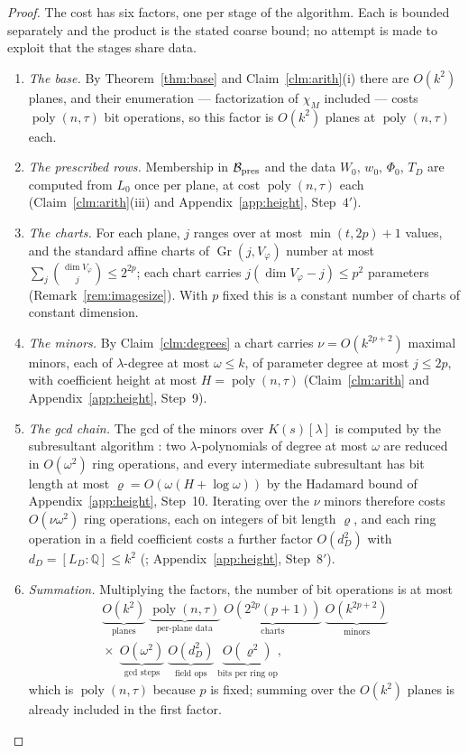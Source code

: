 \documentclass[journal]{IEEEtran}
\theoremstyle{plainn}
\theoremstyle{remark}
\newcommand{\Gr}{\operatorname{Gr}}
\newcommand{\poly}{\operatorname{poly}}
\begin{document}
\begin{proof}
The cost has six factors, one per stage of the algorithm. Each is bounded separately and the product is the
stated coarse bound; no attempt is made to exploit that the stages share data.
\begin{enumerate}[label=(\alph*),leftmargin=*,itemsep=1pt,topsep=2pt]
\item \emph{The base.} By Theorem~\ref{thm:base} and Claim~\ref{clm:arith}(i) there are $O(k^2)$ planes,
and their enumeration --- factorization of $\chi_M$ included --- costs $\poly(n,\tau)$ bit operations, so
this factor is $O(k^2)$ planes at $\poly(n,\tau)$ each.
\item \emph{The prescribed rows.} Membership in $\mathcal B_{\rm pres}$ and the data $W_0$, $w_0$,
$\Phi_0$, $T_D$ are computed from $L_0$ once per plane, at cost $\poly(n,\tau)$ each
(Claim~\ref{clm:arith}(iii) and Appendix~\ref{app:height}, Step~$4'$).
\item \emph{The charts.} For each plane, $j$ ranges over at most $\min(t,2p)+1$ values, and the standard
affine charts of $\Gr(j,V_\varphi)$ number at most $\sum_j\binom{\dim V_\varphi}{j}\le2^{2p}$; each chart
carries $j(\dim V_\varphi-j)\le p^2$ parameters (Remark~\ref{rem:imagesize}). With $p$ fixed this is a
constant number of charts of constant dimension.
\item \emph{The minors.} By Claim~\ref{clm:degrees} a chart carries $\nu=O(k^{2p+2})$ maximal minors, each
of $\lambda$-degree at most $\omega\le k$, of parameter degree at most $j\le2p$, with coefficient height at
most $H=\poly(n,\tau)$ (Claim~\ref{clm:arith} and Appendix~\ref{app:height}, Step~9).
\item \emph{The gcd chain.} The gcd of the minors over $K(s)[\lambda]$ is computed by the subresultant
algorithm \cite{vzgg13}: two $\lambda$-polynomials of degree at most $\omega$ are reduced in $O(\omega^2)$
ring operations, and every intermediate subresultant has bit length at most
$\varrho=O(\omega(H+\log\omega))$ by the Hadamard bound of Appendix~\ref{app:height}, Step~10. Iterating
over the $\nu$ minors therefore costs $O(\nu\omega^2)$ ring operations, each on integers of bit length
$\varrho$, and each ring operation in a field coefficient costs a further factor $O(d_D^2)$ with
$d_D=[L_D:\mathbb Q]\le k^2$ (\cite{cohen93}; Appendix~\ref{app:height}, Step~$8'$).
\item \emph{Summation.} Multiplying the factors, the number of bit operations is at most
\[
\begin{gathered}
\underbrace{O(k^2)}_{\text{planes}}\;
\underbrace{\poly(n,\tau)}_{\text{per-plane data}}\;
\underbrace{O(2^{2p}(p+1))}_{\text{charts}}\;
\underbrace{O(k^{2p+2})}_{\text{minors}}\\[2pt]
{}\times{}\;
\underbrace{O(\omega^{2})}_{\text{gcd steps}}\;
\underbrace{O(d_D^{2})}_{\text{field ops}}\;
\underbrace{O(\varrho^{2})}_{\text{bits per ring op}} ,
\end{gathered}
\]
which is $\poly(n,\tau)$ because $p$ is fixed; summing over the $O(k^2)$ planes is already included in the
first factor.
\end{enumerate}
\end{proof}
\end{document}
